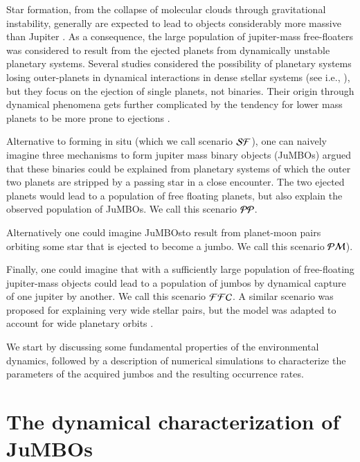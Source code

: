 \documentclass[aa]{aa}
\newcommand{\jumbos}{\mbox{JuMBOs}}
\begin{document}
Star formation, from the collapse of molecular clouds through
gravitational instability, generally are expected to lead to objects
considerably more massive than Jupiter \citep{Low1976, Boyd2005}.  As
a consequence, the large population of jupiter-mass free-floaters was
considered to result from the ejected planets from dynamically
unstable planetary systems.  Several studies considered the
possibility of planetary systems losing outer-planets in dynamical
interactions in dense stellar systems (see i.e.,
\citet{1996Sci...274..954R,2015MNRAS.453.2759Z, 2017MNRAS.470.4337C,
  2019MNRAS.489.2280F, 2019A&A...624A.120V}), but they focus on the
ejection of single planets, not binaries.  Their origin through
dynamical phenomena gets further complicated by the tendency for lower
mass planets to be more prone to ejections \citep{Ford2001,
  2013MNRAS.433..867H,2019MNRAS.489.2280F,2020MNRAS.497.1807S}.

Alternative to forming in situ (which we call scenario ${\cal SF}$),
one can naively imagine three mechanisms to form jupiter mass binary
objects (\jumbos) \cite{2023arXiv231006016W} argued that these
binaries could be explained from planetary systems of which the outer
two planets are stripped by a passing star in a close encounter. The
two ejected planets would lead to a population of free floating
planets, but also explain the observed population of \jumbos.  We call
this scenario ${\cal PP}$.

Alternatively one could imagine \jumbos to result from planet-moon
pairs orbiting some star that is ejected to become a jumbo.  We call
this scenario ${\cal PM}$).

Finally, one could imagine that with a sufficiently large population
of free-floating jupiter-mass objects could lead to a population of
jumbos by dynamical capture of one jupiter by another.  We call this
scenario ${\cal FFC}$. A similar scenario was proposed
\cite{2010MNRAS.404.1835K,} for explaining very wide stellar pairs,
but the model was adapted to account for wide planetary orbits
\cite{2012ApJ...750...83P}.

We start by discussing some fundamental properties of the
environmental dynamics, followed by a description of numerical
simulations to characterize the parameters of the acquired jumbos and
the resulting occurrence rates.

\section{The dynamical characterization of \jumbos}
\end{document}
